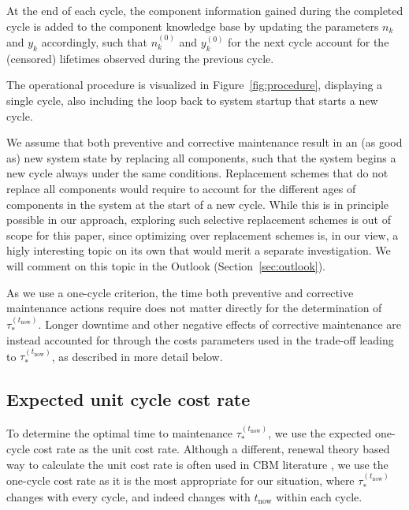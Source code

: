 \documentclass[authoryear]{elsarticle}
\newcommand{\uz}{^{(0)}} %
\def\ykz{y\uz_k}
\def\nkz{n\uz_k}
\newcommand{\nk}{n_k}
\newcommand{\yk}{y_k}
\def\tnow{t_\text{now}}
\newcommand{\Rsysnow}{R^{(t_\text{now})}_\text{sys}}
\newcommand{\tausnow}{\tau_*^{(\tnow)}}
\begin{document}
At the end of each cycle,
the component information gained during the completed cycle is added to the component knowledge base
by updating the parameters $\nk$ and $\yk$ accordingly,
such that $\nkz$ and $\ykz$ for the next cycle account for the (censored) lifetimes observed during the previous cycle.

The operational procedure is visualized in Figure~\ref{fig:procedure},
displaying a single cycle,
also including the loop back to system startup that starts a new cycle.

We assume that both preventive and corrective maintenance result in an (as good as) new system state by replacing all components,
such that the system begins a new cycle always under the same conditions.
Replacement schemes that do not replace all components would require to account for the different ages of components in the system
at the start of a new cycle.
While this is in principle possible in our approach,
exploring such selective replacement schemes is out of scope for this paper,
since optimizing over replacement schemes is, in our view, a higly interesting topic on its own
that would merit a separate investigation.
We will comment on this topic in the Outlook (Section~\ref{sec:outlook}).

As we use a one-cycle criterion, the time both preventive and corrective maintenance actions require
does not matter directly for the determination of $\tausnow$.
Longer downtime and other negative effects of corrective maintenance
are instead accounted for through the costs parameters used in the trade-off leading to $\tausnow$,
as described in more detail below.



\subsection{Expected unit cycle cost rate}
\label{sec:costrate}

To determine the optimal time to maintenance $\tausnow$,
we use the expected one-cycle cost rate 
\citep{1984:ansell-bendell-humble,1996:mazzuchi-soyer,2006:coolen-schrijner-coolen}
as the unit cost rate.
Although a different, renewal theory based way to calculate the unit cost rate is often used
in CBM literature \citep[e.g.,][]{2013:si-et-al,2011:kim-et-al},
we use the one-cycle cost rate as it is the most appropriate for our situation,
where $\tausnow$ changes with every cycle, and indeed changes with $\tnow$ within each cycle.
\end{document}
